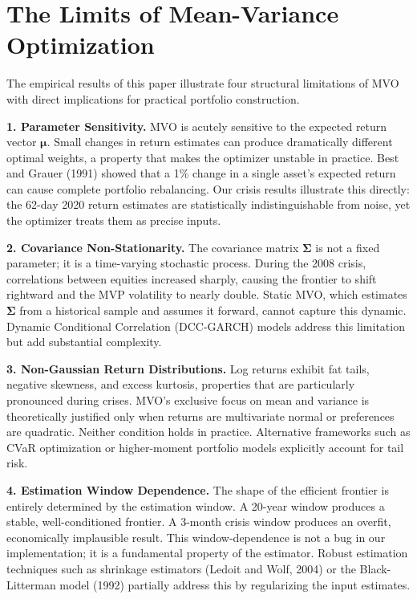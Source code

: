 \documentclass[12pt]{article}
\begin{document}
\section{The Limits of Mean-Variance Optimization}
\label{sec:limits}

The empirical results of this paper illustrate four structural limitations
of MVO with direct implications for practical portfolio construction.

\textbf{1. Parameter Sensitivity.} MVO is acutely sensitive to the expected
return vector $\boldsymbol{\mu}$. Small changes in return estimates can produce
dramatically different optimal weights, a property that makes the optimizer
unstable in practice. Best and Grauer (1991) showed that a 1\% change in a
single asset's expected return can cause complete portfolio rebalancing. Our
crisis results illustrate this directly: the 62-day 2020 return estimates are
statistically indistinguishable from noise, yet the optimizer treats them as
precise inputs.

\textbf{2. Covariance Non-Stationarity.} The covariance matrix
$\boldsymbol{\Sigma}$ is not a fixed parameter; it is a time-varying stochastic
process. During the 2008 crisis, correlations between equities increased
sharply, causing the frontier to shift rightward and the MVP volatility to
nearly double. Static MVO, which estimates $\boldsymbol{\Sigma}$ from a
historical sample and assumes it forward, cannot capture this dynamic.
Dynamic Conditional Correlation (DCC-GARCH) models address this limitation
but add substantial complexity.

\textbf{3. Non-Gaussian Return Distributions.} Log returns exhibit fat tails,
negative skewness, and excess kurtosis, properties that are particularly
pronounced during crises. MVO's exclusive focus on mean and variance is
theoretically justified only when returns are multivariate normal or
preferences are quadratic. Neither condition holds in practice. Alternative
frameworks such as CVaR optimization or higher-moment portfolio models
explicitly account for tail risk.

\textbf{4. Estimation Window Dependence.} The shape of the efficient frontier
is entirely determined by the estimation window. A 20-year window produces a
stable, well-conditioned frontier. A 3-month crisis window produces an overfit,
economically implausible result. This window-dependence is not a bug in our
implementation; it is a fundamental property of the estimator. Robust
estimation techniques such as shrinkage estimators (Ledoit and Wolf, 2004) or
the Black-Litterman model (1992) partially address this by regularizing the
input estimates.
\end{document}
